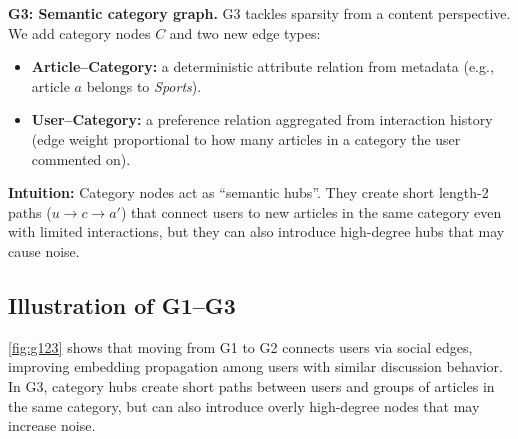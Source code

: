 \documentclass[11pt]{article}
\begin{document}
\textbf{G3: Semantic category graph.}
G3 tackles sparsity from a content perspective. We add category nodes $C$ and two new edge types:
\begin{itemize}
    \item \textbf{Article--Category:} a deterministic attribute relation from metadata (e.g., article $a$ belongs to \textit{Sports}).
    \item \textbf{User--Category:} a preference relation aggregated from interaction history (edge weight proportional to how many articles in a category the user commented on).
\end{itemize}
\textbf{Intuition:} Category nodes act as ``semantic hubs''. They create short length-2 paths ($u \to c \to a'$) that connect users to new articles in the same category even with limited interactions, but they can also introduce high-degree hubs that may cause noise.

\subsection{Illustration of G1--G3}
\autoref{fig:g123} shows that moving from G1 to G2 connects users via social edges, improving embedding propagation among users with similar discussion behavior. In G3, category hubs create short paths between users and groups of articles in the same category, but can also introduce overly high-degree nodes that may increase noise.
\end{document}
